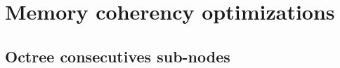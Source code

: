 \documentclass[10pt,twocolumn,a4paper]{article}
\begin{document}
\section{Memory coherency optimizations}
\subsection{Octree consecutives sub-nodes}


\end{document}
